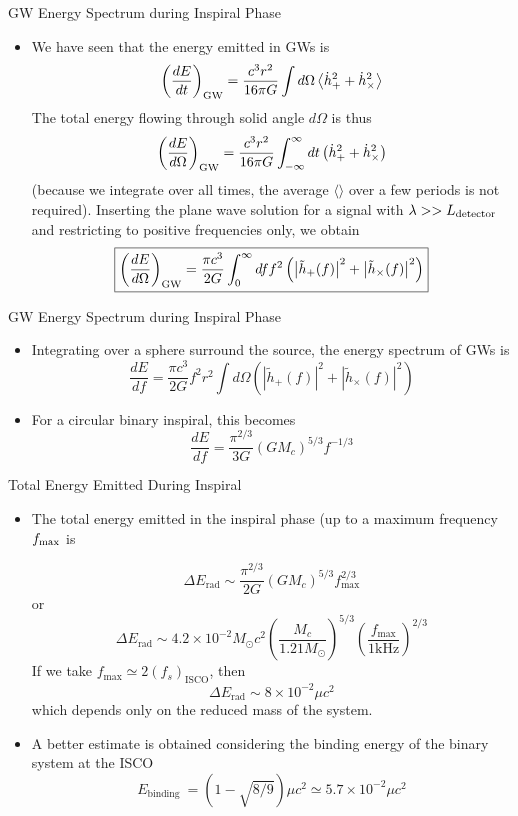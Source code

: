\documentclass[size=11pt,style=paintings]{powerdot}
\begin{document}
 \begin{slide}{GW Energy Spectrum  during Inspiral Phase}
 \begin{itemize}
 \item We have seen that the energy emitted in GWs is
 $$
\left(\frac{d E}{d t}\right)_{\rm GW}=\frac{c^{3} r^{2}}{16 \pi G} \int d \Omega\left\langle\dot{h}_{+}^{2}+\dot{h}_{\times}^{2}\right\rangle
$$
The total energy flowing through solid angle $d\Omega$ is thus
 $$
\left(\frac{d E}{d \Omega}\right)_{\rm GW}=\frac{c^{3} r^{2}}{16 \pi G} \int_{-\infty}^{\infty} dt \left(\dot{h}_{+}^{2}+\dot{h}_{\times}^{2}\right)
$$
(because we integrate over all times, the average $\langle \rangle$ over a few periods is not required). Inserting the plane wave solution for a signal with $\lambda>>L_{\rm detector}$ and restricting to positive frequencies only, we obtain
$$
\boxed{\left(\frac{d E}{d \Omega}\right)_{\rm GW}=\frac{\pi c^{3}}{2 G} \int_{0}^{\infty} d f f^{2}\left(\left|\tilde{h}_{+}(f)\right|^{2}+\left|\tilde{h}_{\times}(f)\right|^{2}\right)
}$$
 \end{itemize}
 \end{slide}
 
 \begin{slide}{GW Energy Spectrum  during Inspiral Phase}
 \begin{itemize}
 \item Integrating over a sphere surround the source, the energy spectrum of GWs is 
$$
\boxed{\frac{d E}{d f}=\frac{\pi c^{3}}{2 G} f^{2} r^{2} \int d \Omega\left(\left|\tilde{h}_{+}(f)\right|^{2}+\left|\tilde{h}_{\times}(f)\right|^{2}\right)}
$$
\item For a circular binary inspiral, this becomes
$$
\boxed{\frac{d E}{d f}=\frac{\pi^{2 / 3}}{3 G}\left(G M_{c}\right)^{5 / 3} f^{-1 / 3}}
$$
 \end{itemize}
 \end{slide}
 
 \begin{slide}{Total Energy Emitted During Inspiral}
 \begin{itemize}
 \item  The total energy emitted in the inspiral phase (up to a maximum frequency
$f_{\rm max}$ is
 
$$
\Delta E_{\mathrm{rad}} \sim \frac{\pi^{2 / 3}}{2 G}\left(G M_{c}\right)^{5
/ 3} f_{\max }^{2 / 3}
$$
or
$$
\Delta E_{\mathrm{rad}} \sim 4.2 \times 10^{-2} M_{\odot} c^{2}\left(\frac{M_{c}}{1.21
M_{\odot}}\right)^{5 / 3}\left(\frac{f_{\max }}{1 \mathrm{kHz}}\right)^{2
/ 3}
$$
If we take $ f_{\max }\simeq2\left(f_{s}\right)_{\mathrm{ISCO}}$, then
$$
\boxed{\Delta E_{\mathrm{rad}} \sim 8 \times 10^{-2} \mu c^{2}}
$$
which depends only on the reduced mass of the system.
\vspace{0.3cm}
\item A better estimate is obtained considering the binding energy of the binary system at the ISCO $$
E_{\text {binding }}=(1-\sqrt{8 / 9}) \mu c^{2} \simeq 5.7 \times 10^{-2} \mu c^{2}
$$
 \end{itemize}
 \end{slide}
 
\end{document}
